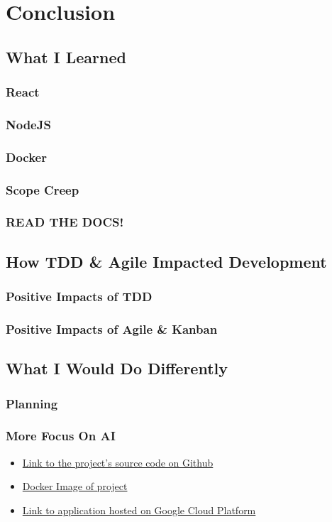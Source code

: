 \chapter{Conclusion}
\section{What I Learned}
\subsection{React}
\subsection{NodeJS}
\subsection{Docker}
\subsection{Scope Creep}
\subsection{READ THE DOCS!}
\section{How TDD \& Agile Impacted Development}
\subsection{Positive Impacts of TDD}
\subsection{Positive Impacts of Agile \& Kanban}
\section{What I Would Do Differently}
\subsection{Planning}
\subsection{More Focus On AI}

\begin{appendices}
\begin{itemize}
\item \href{https://github.com/Ultan-Kearns/AppliedProject}{Link to the project's source code on Github}
\item \href{https://hub.docker.com/repository/docker/ultan/applied-project}{Docker Image of project}
\item \href{}{Link to application hosted on Google Cloud Platform}
\end{itemize}
\end{appendices}



